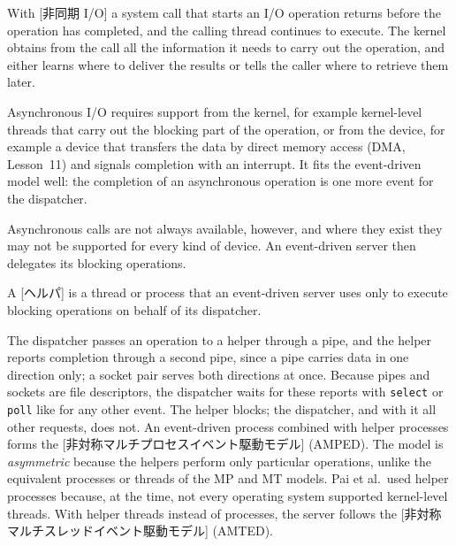 \documentclass[../main.tex]{subfiles}
\begin{document}
\begin{definition}[Asynchronous I/O]
  With [非同期 I/O] a system call that starts an I/O
  operation returns before the operation has completed, and the calling
  thread continues to execute.  The kernel obtains from the call all the
  information it needs to carry out the operation, and either learns where
  to deliver the results or tells the caller where to retrieve them later.
\end{definition}

Asynchronous I/O requires support from the kernel, for example kernel-level
threads that carry out the blocking part of the operation, or from the
device, for example a device that transfers the data by direct memory access
(DMA, Lesson~11) and signals completion with an interrupt.  It fits the
event-driven model well: the completion of an asynchronous operation is one
more event for the dispatcher.

Asynchronous calls are not always available, however, and where they exist
they may not be supported for every kind of device.  An event-driven server
then delegates its blocking operations.

\begin{definition}[Helper]
  A [ヘルパ] is a thread or process that an event-driven server
  uses only to execute blocking operations on behalf of its dispatcher.
\end{definition}

The dispatcher passes an operation to a helper through a pipe, and the
helper reports completion through a second pipe, since a pipe carries data
in one direction only; a socket pair serves both directions at once.  Because
pipes and sockets are file descriptors, the dispatcher waits for these reports
with \texttt{select} or \texttt{poll} like for any other event.  The helper
blocks; the dispatcher, and with it all other requests, does not.  An
event-driven process combined with helper processes forms the
[非対称マルチプロセスイベント駆動モデル]%
 (AMPED).
The model is \emph{asymmetric} because the helpers perform only particular
operations, unlike the equivalent processes or threads of the MP and MT
models.  Pai et al.\ used helper processes because, at the time, not every
operating system supported kernel-level threads.  With helper threads
instead of processes, the server follows the
[非対称マルチスレッドイベント駆動モデル]%
 (AMTED).
\end{document}
